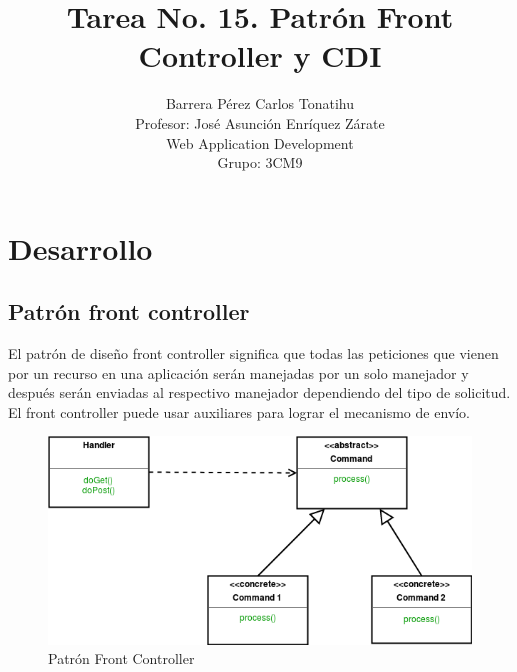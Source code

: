 \documentclass[a4paper,12pt]{article}
\title{Tarea No. 15. Patrón Front Controller y CDI}
\author{Barrera Pérez Carlos Tonatihu \\ Profesor: José Asunción Enríquez 
Zárate \\ Web Application Development \\ Grupo: 3CM9 }
\begin{document}
\maketitle
\newpage

\section{Desarrollo}
\subsection{Patrón front controller}
El patrón de diseño front controller significa que todas las peticiones que 
vienen por un recurso en una aplicación serán manejadas por un solo manejador y 
después serán enviadas al respectivo manejador dependiendo del tipo de 
solicitud. El front controller puede usar auxiliares para lograr el mecanismo 
de envío.

\begin{figure}[H]
    \begin{center}
    \includegraphics[width=\textwidth]{uml-front-controller-design-pattern.png}
    \caption{Patrón Front Controller}
    \label{fig:diagrama}
    \end{center}
\end{figure}
\end{document}
